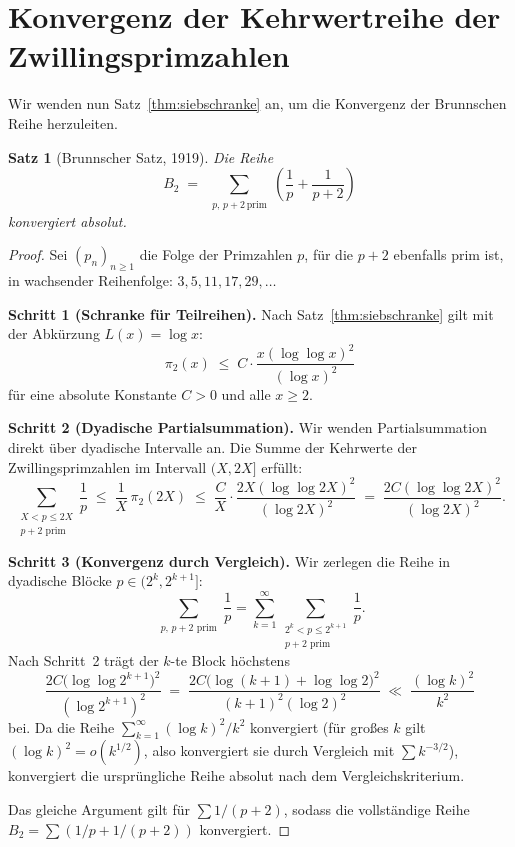 \documentclass[12pt,a4paper]{amsart}
\newtheorem{theorem}{Satz}[section]
\theoremstyle{definition}
\begin{document}
\section{Konvergenz der Kehrwertreihe der Zwillingsprimzahlen}
\label{sec:konvergenz}

Wir wenden nun Satz~\ref{thm:siebschranke} an, um die Konvergenz der
Brunnschen Reihe herzuleiten.

\begin{theorem}[Brunnscher Satz, 1919]\label{thm:brun_konvergenz}
  Die Reihe
  \[
    B_2 \;=\; \sum_{\substack{p,\,p+2\,\text{prim}}}
               \left(\frac{1}{p} + \frac{1}{p+2}\right)
  \]
  konvergiert absolut.
\end{theorem}

\begin{proof}
  Sei $(p_n)_{n \geq 1}$ die Folge der Primzahlen $p$, für die $p+2$ ebenfalls
  prim ist, in wachsender Reihenfolge: $3, 5, 11, 17, 29, \ldots$

  \textbf{Schritt 1 (Schranke für Teilreihen).}
  Nach Satz~\ref{thm:siebschranke} gilt mit der Abkürzung $L(x) = \log x$:
  \[
    \pi_2(x) \;\leq\; C \cdot \frac{x (\log\log x)^2}{(\log x)^2}
  \]
  für eine absolute Konstante $C > 0$ und alle $x \geq 2$.

  \textbf{Schritt 2 (Dyadische Partialsummation).}
  Wir wenden Partialsummation direkt über dyadische Intervalle an.
  Die Summe der Kehrwerte der Zwillingsprimzahlen im Intervall $(X, 2X]$ erfüllt:
  \[
    \sum_{\substack{X < p \leq 2X \\ p+2\text{ prim}}} \frac{1}{p}
    \;\leq\; \frac{1}{X}\, \pi_2(2X)
    \;\leq\; \frac{C}{X} \cdot \frac{2X(\log\log 2X)^2}{(\log 2X)^2}
    \;=\; \frac{2C(\log\log 2X)^2}{(\log 2X)^2}.
  \]

  \textbf{Schritt 3 (Konvergenz durch Vergleich).}
  Wir zerlegen die Reihe in dyadische Blöcke $p \in (2^k, 2^{k+1}]$:
  \[
    \sum_{\substack{p,\,p+2\text{ prim}}} \frac{1}{p}
    = \sum_{k=1}^{\infty} \sum_{\substack{2^k < p \leq 2^{k+1}\\ p+2\text{ prim}}}
      \frac{1}{p}.
  \]
  Nach Schritt~2 trägt der $k$-te Block höchstens
  \[
    \frac{2C\bigl(\log\log 2^{k+1}\bigr)^2}
         {(\log 2^{k+1})^2}
    \;=\; \frac{2C\bigl(\log(k+1) + \log\log 2\bigr)^2}
               {(k+1)^2 (\log 2)^2}
    \;\ll\; \frac{(\log k)^2}{k^2}
  \]
  bei.  Da die Reihe $\sum_{k=1}^{\infty} (\log k)^2 / k^2$ konvergiert
  (für großes $k$ gilt $(\log k)^2 = o(k^{1/2})$, also konvergiert sie
  durch Vergleich mit $\sum k^{-3/2}$), konvergiert die ursprüngliche Reihe
  absolut nach dem Vergleichskriterium.

  Das gleiche Argument gilt für $\sum 1/(p+2)$, sodass die vollständige
  Reihe $B_2 = \sum (1/p + 1/(p+2))$ konvergiert.
\end{proof}
\end{document}
